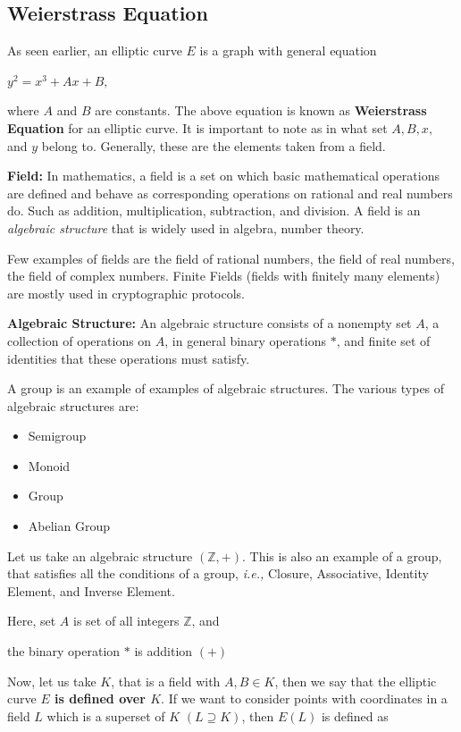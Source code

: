 \documentclass[a4paper, 12pt]{article}
\begin{document}
\subsection{Weierstrass Equation}
As seen earlier, an elliptic curve $E$ is a graph with general equation
\begin{center}$y^2=x^3+Ax+B,$\end{center}
where $A$ and $B$ are constants. The above equation is known as \textbf{Weierstrass Equation} for an elliptic curve. It is important to note as in what set $A, B, x,$ and $y$ belong to. Generally, these are the elements taken from a field.\par
\textbf{Field:} In mathematics, a field is a set on which basic mathematical operations are defined and behave as corresponding operations on rational and real numbers do. Such as addition, multiplication, subtraction, and division. A field is an \textit{algebraic structure} that is widely used in algebra, number theory.\par
Few examples of fields are the field of rational numbers, the field of real numbers, the field of complex numbers. Finite Fields (fields with finitely many elements) are mostly used in cryptographic protocols.\par
\textbf{Algebraic Structure:} An algebraic structure consists of a nonempty set $A$, a collection of operations on $A$, in general binary operations $*$, and finite set of identities that these operations must satisfy.\par
A group is an example of examples of algebraic structures. The various types of algebraic structures are:
\begin{itemize}
	\item Semigroup
	\item Monoid
	\item Group
	\item Abelian Group
\end{itemize}
Let us take an algebraic structure $(\mathbb{Z},+)$. This is also an example of a group, that satisfies all the conditions of a group, \textit{i.e.,} Closure, Associative, Identity Element, and Inverse Element.
\begin{center}
Here, set $A$ is set of all integers $\mathbb{Z}$, and\par
the binary operation $*$ is addition $(+)$
\end{center}\par
Now, let us take $K$, that is a field with $A,B\in K$, then we say that the elliptic curve \textbf{$E$ is defined over $K$}. If we want to consider points with coordinates in a field $L$ which is a superset of $K$ $(L\supseteq K )$, then $E(L)$ is defined as
\end{document}
